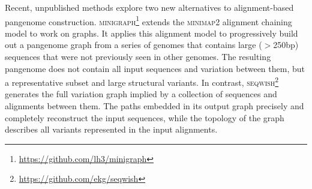 Recent, unpublished methods explore two new alternatives to alignment-based pangenome construction.
\textsc{minigraph}\footnote{\url{https://github.com/lh3/minigraph}} extends the \textsc{minimap2} \cite{Li_2018} alignment chaining model to work on graphs.
It applies this alignment model to progressively build out a pangenome graph from a series of genomes that contains large ($>$250bp) sequences that were not previously seen in other genomes.
The resulting pangenome does not contain all input sequences and variation between them, but a representative subset and large structural variants.
In contrast, \textsc{seqwish}\footnote{\url{https://github.com/ekg/seqwish}} \cite{Garrison_2019} generates the full variation graph implied by a collection of sequences and alignments between them.
The paths embedded in its output graph precisely and completely reconstruct the input sequences, while the topology of the graph describes all variants represented in the input alignments.









